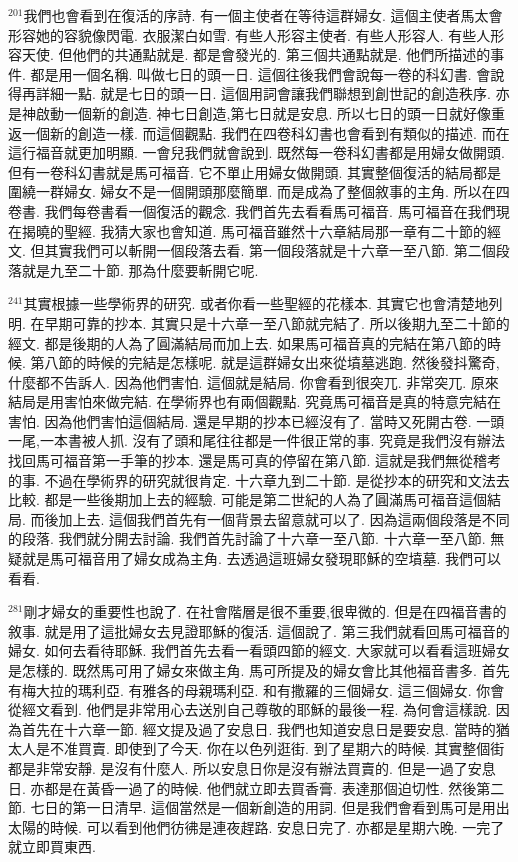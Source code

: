 \documentclass{book}
\begin{document}
$^{201}$我們也會看到在復活的序詩.
有一個主使者在等待這群婦女.
這個主使者馬太會形容她的容貌像閃電.
衣服潔白如雪.
有些人形容主使者.
有些人形容人.
有些人形容天使.
但他們的共通點就是.
都是會發光的.
第三個共通點就是.
他們所描述的事件.
都是用一個名稱.
叫做七日的頭一日.
這個往後我們會說每一卷的科幻書.
會說得再詳細一點.
就是七日的頭一日.
這個用詞會讓我們聯想到創世記的創造秩序.
亦是神啟動一個新的創造.
神七日創造,第七日就是安息.
所以七日的頭一日就好像重返一個新的創造一樣.
而這個觀點.
我們在四卷科幻書也會看到有類似的描述.
而在這行福音就更加明顯.
一會兒我們就會說到.
既然每一卷科幻書都是用婦女做開頭.
但有一卷科幻書就是馬可福音.
它不單止用婦女做開頭.
其實整個復活的結局都是圍繞一群婦女.
婦女不是一個開頭那麼簡單.
而是成為了整個敘事的主角.
所以在四卷書.
我們每卷書看一個復活的觀念.
我們首先去看看馬可福音.
馬可福音在我們現在揭曉的聖經.
我猜大家也會知道.
馬可福音雖然十六章結局那一章有二十節的經文.
但其實我們可以斬開一個段落去看.
第一個段落就是十六章一至八節.
第二個段落就是九至二十節.
那為什麼要斬開它呢.

$^{241}$其實根據一些學術界的研究.
或者你看一些聖經的花樣本.
其實它也會清楚地列明.
在早期可靠的抄本.
其實只是十六章一至八節就完結了.
所以後期九至二十節的經文.
都是後期的人為了圓滿結局而加上去.
如果馬可福音真的完結在第八節的時候.
第八節的時候的完結是怎樣呢.
就是這群婦女出來從墳墓逃跑.
然後發抖驚奇,什麼都不告訴人.
因為他們害怕.
這個就是結局.
你會看到很突兀.
非常突兀.
原來結局是用害怕來做完結.
在學術界也有兩個觀點.
究竟馬可福音是真的特意完結在害怕.
因為他們害怕這個結局.
還是早期的抄本已經沒有了.
當時又死開古卷.
一頭一尾,一本書被人抓.
沒有了頭和尾往往都是一件很正常的事.
究竟是我們沒有辦法找回馬可福音第一手筆的抄本.
還是馬可真的停留在第八節.
這就是我們無從稽考的事.
不過在學術界的研究就很肯定.
十六章九到二十節.
是從抄本的研究和文法去比較.
都是一些後期加上去的經驗.
可能是第二世紀的人為了圓滿馬可福音這個結局.
而後加上去.
這個我們首先有一個背景去留意就可以了.
因為這兩個段落是不同的段落.
我們就分開去討論.
我們首先討論了十六章一至八節.
十六章一至八節.
無疑就是馬可福音用了婦女成為主角.
去透過這班婦女發現耶穌的空墳墓.
我們可以看看.

$^{281}$剛才婦女的重要性也說了.
在社會階層是很不重要,很卑微的.
但是在四福音書的敘事.
就是用了這批婦女去見證耶穌的復活.
這個說了.
第三我們就看回馬可福音的婦女.
如何去看待耶穌.
我們首先去看一看頭四節的經文.
大家就可以看看這班婦女是怎樣的.
既然馬可用了婦女來做主角.
馬可所提及的婦女會比其他福音書多.
首先有梅大拉的瑪利亞.
有雅各的母親瑪利亞.
和有撒羅的三個婦女.
這三個婦女.
你會從經文看到.
他們是非常用心去送別自己尊敬的耶穌的最後一程.
為何會這樣說.
因為首先在十六章一節.
經文提及過了安息日.
我們也知道安息日是要安息.
當時的猶太人是不准買賣.
即使到了今天.
你在以色列逛街.
到了星期六的時候.
其實整個街都是非常安靜.
是沒有什麼人.
所以安息日你是沒有辦法買賣的.
但是一過了安息日.
亦都是在黃昏一過了的時候.
他們就立即去買香膏.
表達那個迫切性.
然後第二節.
七日的第一日清早.
這個當然是一個新創造的用詞.
但是我們會看到馬可是用出太陽的時候.
可以看到他們彷彿是連夜趕路.
安息日完了.
亦都是星期六晚.
一完了就立即買東西.
\end{document}
